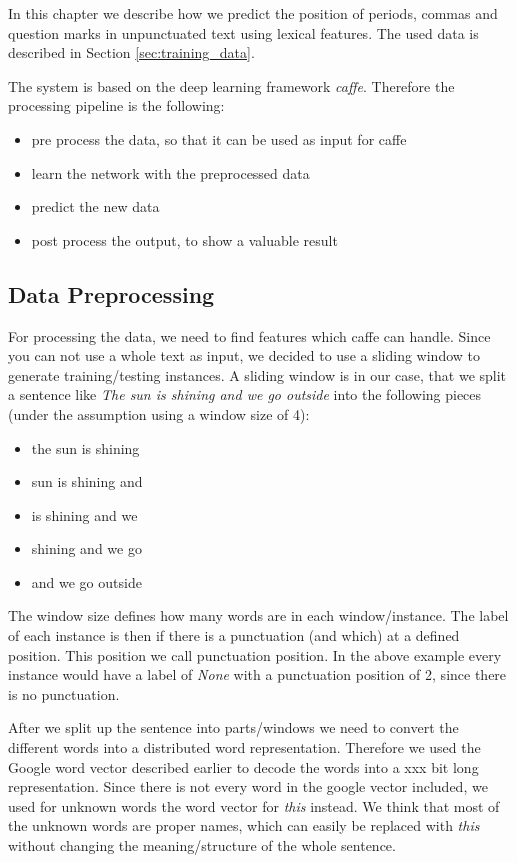 In this chapter we describe how we predict the position of periods, commas and question marks in unpunctuated text using lexical features.
The used data is described in Section \ref{sec:training_data}.

The system is based on the deep learning framework \emph{caffe}.
Therefore the processing pipeline is the following:

\begin{itemize}
\item pre process the data, so that it can be used as input for caffe
\item learn the network with the preprocessed data
\item predict the new data
\item post process the output, to show a valuable result
\end{itemize}

\subsection{Data Preprocessing}

For processing the data, we need to find features which caffe can handle.
Since you can not use a whole text as input, we decided to use a sliding window to generate training/testing instances.
A sliding window is in our case, that we split a sentence like \emph{The sun is shining and we go outside} into the following pieces (under the assumption using a window size of 4):
\begin{itemize}
\item the sun is shining
\item sun is shining and
\item is shining and we
\item shining and we go
\item and we go outside
\end{itemize}

The window size defines how many words are in each window/instance.
The label of each instance is then if there is a punctuation (and which) at a defined position.
This position we call punctuation position.
In the above example every instance would have a label of \emph{None} with a punctuation position of 2, since there is no punctuation.

After we split up the sentence into parts/windows we need to convert the different words into a distributed word representation.
Therefore we used the Google word vector described earlier to decode the words into a xxx bit long representation.
Since there is not every word in the google vector included, we used for unknown words the word vector for \emph{this} instead.
We think that most of the unknown words are proper names, which can easily be replaced with \emph{this} without changing the meaning/structure of the whole sentence.

